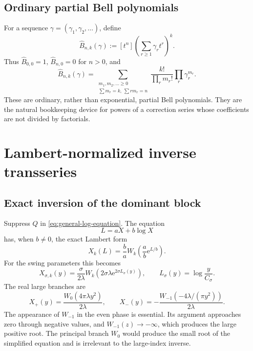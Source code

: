 \documentclass[11pt,a4paper]{article}
\numberwithin{equation}{section}
\theoremstyle{definition}
\theoremstyle{remark}
\newcommand{\e}{\mathrm e}
\begin{document}
\subsection{Ordinary partial Bell polynomials}

For a sequence \(\gamma=(\gamma_1,\gamma_2,\ldots)\), define
\begin{equation}\label{eq:ordinary-Bell-def}
 \widehat B_{n,k}(\gamma)
 :=[t^n]\left(\sum_{r\ge1}\gamma_rt^r\right)^k.
\end{equation}
Thus \(\widehat B_{0,0}=1\), \(\widehat B_{n,0}=0\) for \(n>0\), and
\begin{equation}\label{eq:ordinary-Bell-partition}
 \widehat B_{n,k}(\gamma)
 =\sum_{\substack{m_1,m_2,\ldots\ge0\\
                   \sum m_r=k,\ \sum rm_r=n}}
   \frac{k!}{\prod_rm_r!}\prod_r\gamma_r^{m_r}.
\end{equation}
These are ordinary, rather than exponential, partial Bell polynomials.  They
are the natural bookkeeping device for powers of a correction series whose
coefficients are not divided by factorials.

\section{Lambert-normalized inverse transseries}
\label{sec:lambert-inverse}

\subsection{Exact inversion of the dominant block}

Suppress \(Q\) in \cref{eq:general-log-equation}.  The equation
\begin{equation}\label{eq:dominant-equation}
 L=aX+b\log X
\end{equation}
has, when \(b\ne0\), the exact Lambert form
\begin{equation}\label{eq:general-Lambert-core}
 X_k(L)=\frac ba
 W_k\!\left(\frac ab\e^{L/b}\right).
\end{equation}
For the swing parameters this becomes
\begin{equation}\label{eq:swing-Lambert-general}
 X_{\sigma,k}(y)=\frac{\sigma}{2\lambda}
 W_k\!\left(2\sigma\lambda\e^{2\sigma L_\sigma(y)}\right),
 \qquad
 L_\sigma(y)=\log\frac{y}{C_\sigma}.
\end{equation}
The real large branches are
\begin{equation}\label{eq:real-Lambert-cores}
 \boxed{
 X_+(y)=\frac{W_0(4\pi\lambda y^2)}{2\lambda},
 \qquad
 X_-(y)=-\frac{W_{-1}(-4\lambda/(\pi y^2))}{2\lambda}.}
\end{equation}
The appearance of \(W_{-1}\) in the even phase is essential.  Its argument
approaches zero through negative values, and \(W_{-1}(z)\to-\infty\), which
produces the large positive root.  The principal branch \(W_0\) would
produce the small root of the simplified equation and is irrelevant to the
large-index inverse.
\end{document}
